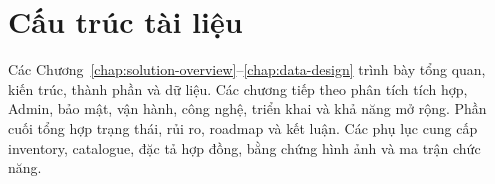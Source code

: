 \section{Cấu trúc tài liệu}

Các Chương~\ref{chap:solution-overview}--\ref{chap:data-design} trình bày tổng quan,
kiến trúc, thành phần và dữ liệu. Các chương tiếp theo phân tích tích hợp, Admin, bảo
mật, vận hành, công nghệ, triển khai và khả năng mở rộng. Phần cuối tổng hợp trạng thái,
rủi ro, roadmap và kết luận. Các phụ lục cung cấp inventory, catalogue, đặc tả hợp đồng,
bằng chứng hình ảnh và ma trận chức năng.
